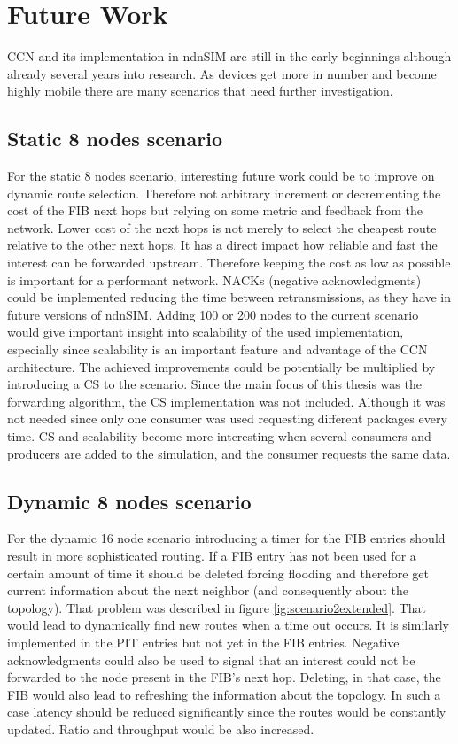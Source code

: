 \section{Future Work}

CCN and its implementation in ndnSIM are still in the early beginnings although already several years into research. As devices get more in number and become highly mobile there are many scenarios that need further investigation.

\subsection{Static 8 nodes scenario}

For the static 8 nodes scenario, interesting future work could be to improve on dynamic route selection. Therefore not arbitrary increment or decrementing the cost of the FIB next hops but relying on some metric and feedback from the network. Lower cost of the next hops is not merely to select the cheapest route relative to the other next hops. It has a direct impact how reliable and fast the interest can be forwarded upstream. Therefore keeping the cost as low as possible is important for a performant network. NACKs (negative acknowledgments) could be implemented reducing the time between retransmissions, as they have in future versions of ndnSIM. Adding 100 or 200 nodes to the current scenario would give important insight into scalability of the used implementation, especially since scalability is an important feature and advantage of the CCN architecture. The achieved improvements could be potentially be multiplied by introducing a CS to the scenario. Since the main focus of this thesis was the forwarding algorithm, the CS implementation was not included. Although it was not needed since only one consumer was used requesting different packages every time. CS and scalability become more interesting when several consumers and producers are added to the simulation, and the consumer requests the same data.

\subsection{Dynamic 8 nodes scenario}

For the dynamic 16 node scenario introducing a timer for the FIB entries should result in more sophisticated routing. If a FIB entry has not been used for a certain amount of time it should be deleted forcing flooding and therefore get current information about the next neighbor (and consequently about the topology). That problem was described in figure \ref{ig:scenario2extended}. That would lead to dynamically find new routes when a time out occurs. It is similarly implemented in the PIT entries but not yet in the FIB entries. Negative acknowledgments could also be used to signal that an interest could not be forwarded to the node present in the FIB's next hop. Deleting, in that case, the FIB would also lead to refreshing the information about the topology. In such a case latency should be reduced significantly since the routes would be constantly updated. Ratio and throughput would be also increased.






